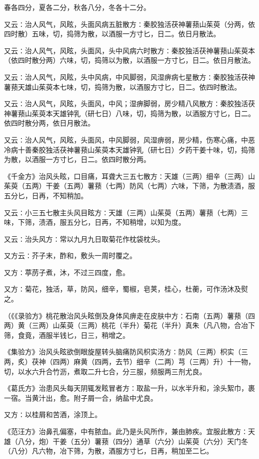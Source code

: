 \documentclass[a4paper,12pt,UTF8,twoside]{ctexbook}
\begin{document}
春各四分，夏各二分，秋各八分，冬各十二分。

又云∶治人风气，风眩，头面风病五脏散方∶秦胶独活茯神薯蓣山茱萸（分两，依四时散）五味，切，捣筛为散，以酒服一方寸匕，日二。依日月散法。

又云∶治人风气，风眩，头面风，头中风病六时散方∶秦胶独活茯神薯蓣山茱萸本（依四时散分两）六味，切，捣筛以为散，以酒服一方寸匕，日二。依日月散法。

又云∶治人风气，风眩，头中风病，中风脚弱，风湿痹病七星散方∶秦胶独活茯神薯蓣天雄山茱萸本七味，切，捣筛为散，以酒服方寸匕，日二。依四时散法。

又云∶治人风气，风眩，头面风，中风；湿痹脚弱，房少精八风散方∶秦胶独活茯神薯蓣山茱萸本天雄钟乳（研七日）八味，切，捣筛为散，以酒服方寸匕，日二。依四时散分两，依日月散法。

又云∶治人风气，风眩，头面风，中风脚弱，风湿痹弱，房少精，伤寒心痛，中恶冷病十善秦胶独活茯神薯蓣山茱萸本天雄钟乳（研七日）夕药干姜十味，切，捣筛为散，以酒服一方寸匕，日二。依四时散分两。

《千金方》治风头眩，口目痛，耳聋大三五七散方∶天雄（三两）细辛（三两）山茱萸（五两）干姜（五两）薯蓣（七两）防风（七两）六味，下筛，为散渍酒，服五分匕，日再，不知稍加。

又云∶小三五七散主头风目眩方∶天雄（三两）山茱萸（五两）薯蓣（七两）三味，下筛，渍酒，服五分匕，日再，不知稍增，以知为度。

又云∶治头风方∶常以九月九日取菊花作枕袋枕头。

又方云∶芥子末，酢和，敷头一周时覆之。

又方∶葶苈子煮，沐，不过三四度，愈。

又方∶菊花，独活，草，防风，细辛，蜀椒，皂荚，桂心，杜蘅，可作汤沐及熨之。

（《《录验方》桃花散治风头眩倒及身体风痹走在皮肤中方∶石南（五两）薯蓣（四两）黄（三两）山茱萸（三两）桃花（半升）菊花（半升）真朱（凡八物，合冶下筛，食竟，酒服半钱匕，日三，稍增之。

《集验方》治风头眩欲倒眼旋屋转头脑痛防风枳实汤方∶防风（三两）枳实（三两，炙）茯神（四两）麻黄（四两，去节）细辛（二两）芎（三两）升）十一物，切，以水六升合竹沥，煮取二升七合，分三服，频服两三剂尤良。

《葛氏方》治患风头每天阴辄发眩冒者方∶取盐一升，以水半升和，涂头絮巾，裹一宿。当黄汁出，愈。附子屑一合，纳盐中尤良。

又方∶以桂屑和苦酒，涂顶上。

《范汪方》治鼻孔偏塞，中有脓血。此乃是头风所作，兼由肺疾。宜服此散方∶天雄（八分，炮）干姜（五分）薯蓣（四分）通草（六分）山茱萸（六分）天门冬（八分）凡六物，冶下筛，为散，酒服方寸匕，日再，稍加至二匕。
\end{document}
